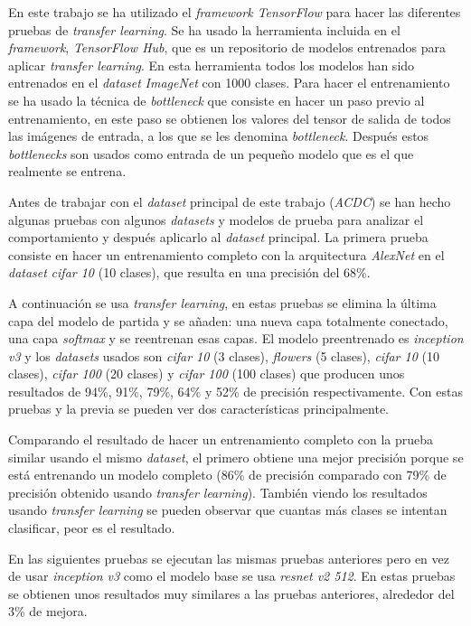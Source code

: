 \documentclass[12pt,a4paper]{article}
\begin{document}
En este trabajo se ha utilizado el \textit{framework TensorFlow} para hacer las diferentes pruebas de \textit{transfer learning}. Se ha usado la herramienta incluida en el \textit{framework}, \textit{TensorFlow Hub}, que es un repositorio de modelos entrenados para aplicar \textit{transfer learning}. En esta herramienta todos los modelos han sido entrenados en el \textit{dataset} \textit{ImageNet} \cite{imagenet} con 1000 clases. Para hacer el entrenamiento se ha usado la técnica de \textit{bottleneck} que consiste en hacer un paso previo al entrenamiento, en este paso se obtienen los valores del tensor de salida de todos las imágenes de entrada, a los que se les denomina \textit{bottleneck}. Después estos \textit{bottlenecks} son usados como entrada de un pequeño modelo que es el que realmente se entrena.
\bigskip

Antes de trabajar con el \textit{dataset} principal de este trabajo (\textit{ACDC}) se han hecho algunas pruebas con algunos \textit{datasets} y modelos de prueba para analizar el comportamiento y después aplicarlo al \textit{dataset} principal. La primera prueba consiste en hacer un entrenamiento completo con la arquitectura \textit{AlexNet} en el \textit{dataset} \textit{cifar 10} (10 clases), que resulta en una precisión del 68\%.
\bigskip

A continuación se usa \textit{transfer learning}, en estas pruebas se elimina la última capa del modelo de partida y se añaden: una nueva capa totalmente conectado, una capa \textit{softmax} y se reentrenan esas capas. El modelo preentrenado es \textit{inception v3} y los \textit{datasets} usados son \textit{cifar 10} (3 clases), \textit{flowers} (5 clases), \textit{cifar 10} (10 clases), \textit{cifar 100} (20 clases) y \textit{cifar 100} (100 clases) que producen unos resultados de 94\%, 91\%, 79\%, 64\% y 52\% de precisión respectivamente. Con estas pruebas y la previa se pueden ver dos características principalmente.
\bigskip

Comparando el resultado de hacer un entrenamiento completo con la prueba similar usando el mismo \textit{dataset}, el primero obtiene una mejor precisión porque se está entrenando un modelo completo (86\% de precisión comparado con 79\% de precisión obtenido usando \textit{transfer learning}). También viendo los resultados usando \textit{transfer learning} se pueden observar que cuantas más clases se intentan clasificar, peor es el resultado.
\bigskip

En las siguientes pruebas se ejecutan las mismas pruebas anteriores pero en vez de usar \textit{inception v3} \cite{DBLP:journals/corr/SzegedyVISW15} como el modelo base se usa \textit{resnet v2 512}. En estas pruebas se obtienen unos resultados muy similares a las pruebas anteriores, alrededor del 3\% de mejora.
\bigskip
\end{document}
